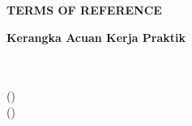 \documentclass[11pt,a4paper]{report}
\begin{document}
\singlespacing\setlength{\parindent}{0pt}\setlength{\parskip}{6pt}
\begin{center}
{\bfseries\Large TERMS OF REFERENCE\par}
{\bfseries Kerangka Acuan Kerja Praktik\par}
\vspace{0.4cm}
\TempatKP\\\PeriodeKP\\[0.4cm]
\NamaRaif{} (\NIMRaif)\\\NamaFrederiko{} (\NIMFrederiko)
\end{center}

\end{document}
